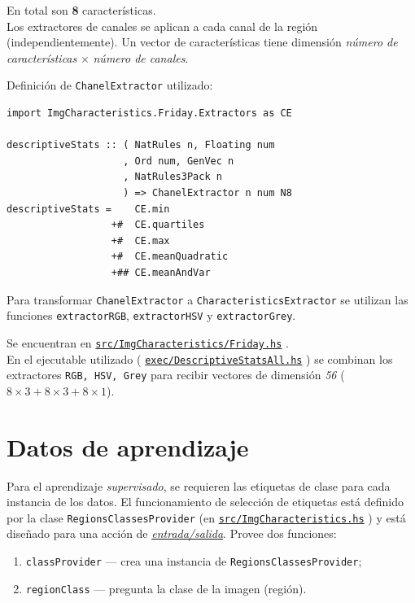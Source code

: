 \documentclass{article}
\newcommand\refcode[2]{ \href{#1}{\texttt{#2}} }
\begin{document}
En total son \textbf{8} características. \\

\noindent Los extractores de canales se aplican a cada canal de la región (independientemente). Un vector de características tiene dimensión \emph{número de características} $\times$ \emph{número de canales}.

\medskip

\noindent Definición de \verb|ChanelExtractor| utilizado:
\begin{lstlisting}
import ImgCharacteristics.Friday.Extractors as CE

descriptiveStats :: ( NatRules n, Floating num
                    , Ord num, GenVec n
                    , NatRules3Pack n
                    ) => ChanelExtractor n num N8
descriptiveStats =    CE.min
                  +#  CE.quartiles
                  +#  CE.max
                  +#  CE.meanQuadratic
                  +## CE.meanAndVar
\end{lstlisting}

\medskip

Para transformar \verb|ChanelExtractor| a \verb|CharacteristicsExtractor| se utilizan las funciones \verb|extractorRGB|, \verb|extractorHSV| y \verb|extractorGrey|.

Se encuentran en \refcode{\Friday}{src/ImgCharacteristics/Friday.hs}.\\

En el ejecutable utilizado (\refcode{\ExecAll}{exec/DescriptiveStatsAll.hs}) se combinan los extractores \verb|RGB, HSV, Grey| para recibir vectores de dimensión \emph{56} ($8\times3 + 8\times3 + 8\times1$).

\section{Datos de aprendizaje}

Para el aprendizaje \emph{supervisado}, se requieren las etiquetas de clase para cada instancia de los datos. El funcionamiento de selección de etiquetas está definido por la clase \verb|RegionsClassesProvider| (en \refcode{\ImgCharacteristics}{src/ImgCharacteristics.hs}) y está diseñado para una acción de \href{https://www.haskell.org/tutorial/io.html}{\emph{entrada/salida}}. Provee dos funciones:
\begin{enumerate}
    \item \verb|classProvider| --- crea una instancia de \verb|RegionsClassesProvider|;
    \item \verb|regionClass| --- pregunta la clase de la imagen (región).
\end{enumerate}
\end{document}
